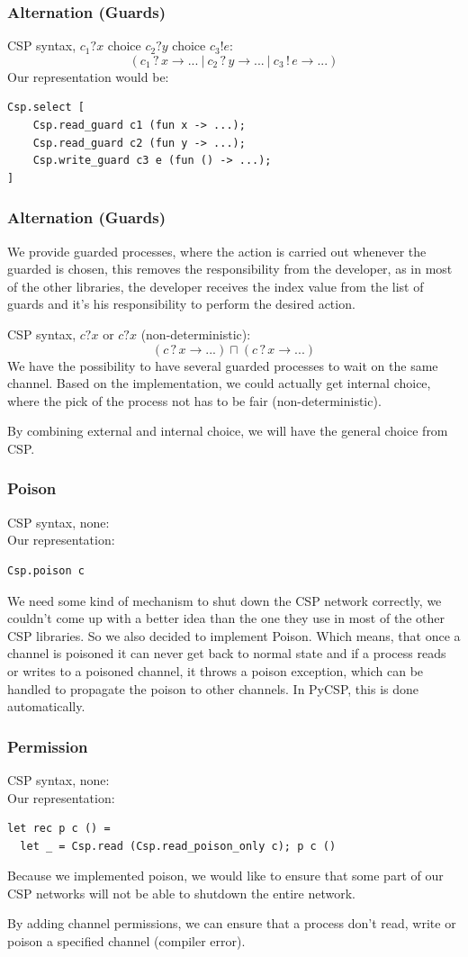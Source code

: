 \documentclass{beamer}
\begin{document}
\begin{frame}[fragile]
  \frametitle{Alternation (Guards)}
  CSP syntax, $c_1?x$ choice $c_2?y$ choice $c_3!e$:
  \[(c_1\,?\,x \to ...\ |\ c_2\,?\,y \to ...\ |\ c_3\,!\,e \to ...)\]
  Our representation would be:
\scriptsize
\begin{verbatim}
Csp.select [
    Csp.read_guard c1 (fun x -> ...);
    Csp.read_guard c2 (fun y -> ...);
    Csp.write_guard c3 e (fun () -> ...);
]
\end{verbatim}
\normalsize
\end{frame}

\begin{frame}[fragile]
  \frametitle{Alternation (Guards)}
  We provide guarded processes, where the action is carried out whenever
  the guarded is chosen, this removes the responsibility from the developer,
  as in most of the other libraries, the developer receives the index value
  from the list of guards and it's his responsibility to perform the desired
  action.

  CSP syntax, $c?x$ or $c?x$ (non-deterministic):
  \[(c\,?\,x \to ...) \sqcap (c\,?\,x \to ...)\]
  We have the possibility to have several guarded processes to wait on the same
  channel. Based on the implementation, we could actually get internal choice,
  where the pick of the process not has to be fair (non-deterministic).

  By combining external and internal choice, we will have the general choice
  from CSP.
\end{frame}


\begin{frame}[fragile]
  \frametitle{Poison}
  CSP syntax, none:
  \[\]
  Our representation:
\scriptsize
\begin{verbatim}
Csp.poison c 
\end{verbatim}
\normalsize
We need some kind of mechanism to shut down the CSP network correctly,
we couldn't come up with a better idea than the one they use in most of the
other CSP libraries. So we also decided to implement Poison. Which means, that
once a channel is poisoned it can never get back to normal state and if a
process reads or writes to a poisoned channel, it throws a poison exception,
which can be handled to propagate the poison to other channels. In PyCSP, this
is done automatically.
\end{frame}


\begin{frame}[fragile]
  \frametitle{Permission}
  CSP syntax, none:
  \[\]
  Our representation:
\scriptsize
\begin{verbatim}
let rec p c () =
  let _ = Csp.read (Csp.read_poison_only c); p c ()
\end{verbatim}
\normalsize
  Because we implemented poison, we would like to ensure that some part of our
  CSP networks will not be able to shutdown the entire network.

  By adding channel permissions, we can ensure that a process don't read, write
  or poison a specified channel (compiler error).
\end{frame}
\end{document}
